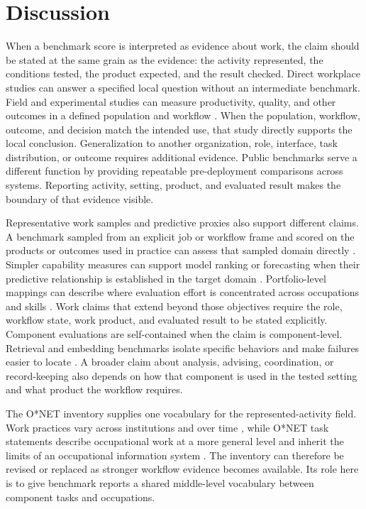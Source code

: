 \documentclass[10pt]{article}
\begin{document}
\section{Discussion}
\label{sec:altviews}

When a benchmark score is interpreted as evidence about work, the claim should be stated at the same grain as the evidence: the activity represented, the conditions tested, the product expected, and the result checked. Direct workplace studies can answer a specified local question without an intermediate benchmark. Field and experimental studies can measure productivity, quality, and other outcomes in a defined population and workflow \citep{dellacqua2023jagged,brynjolfsson2023genai}. When the population, workflow, outcome, and decision match the intended use, that study directly supports the local conclusion. Generalization to another organization, role, interface, task distribution, or outcome requires additional evidence. Public benchmarks serve a different function by providing repeatable pre-deployment comparisons across systems. Reporting activity, setting, product, and evaluated result makes the boundary of that evidence visible.

Representative work samples and predictive proxies also support different claims. A benchmark sampled from an explicit job or workflow frame and scored on the products or outcomes used in practice can assess that sampled domain directly \citep{roth2005worksample}. Simpler capability measures can support model ranking or forecasting when their predictive relationship is established in the target domain \citep{ruan2024observational}. Portfolio-level mappings can describe where evaluation effort is concentrated across occupations and skills \citep{wang2026realwork}. Work claims that extend beyond those objectives require the role, workflow state, work product, and evaluated result to be stated explicitly. Component evaluations are self-contained when the claim is component-level. Retrieval and embedding benchmarks isolate specific behaviors and make failures easier to locate \citep{thakur2021beir,muennighoff2022mteb}. A broader claim about analysis, advising, coordination, or record-keeping also depends on how that component is used in the tested setting and what product the workflow requires.

The O{*}NET inventory supplies one vocabulary for the represented-activity field. Work practices vary across institutions and over time \citep{suchman1987plans,kellogg2020algorithms}, while O{*}NET task statements describe occupational work at a more general level and inherit the limits of an occupational information system \citep{handel2016onet,onet2024tasks}. The inventory can therefore be revised or replaced as stronger workflow evidence becomes available. Its role here is to give benchmark reports a shared middle-level vocabulary between component tasks and occupations.
\end{document}
